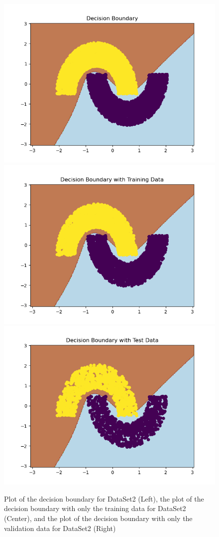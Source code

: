 \documentclass[letterpaper, 12pt]{article}
\begin{document}
\begin{figure}[H]
\centering
\includegraphics[scale = 0.33]{DataSet2BoundaryPlot}
\includegraphics[scale = 0.33]{DataSet2TrainBoundaryPlot}
\includegraphics[scale = 0.33]{DataSet2TestBoundaryPlot}
\caption{Plot of the decision boundary for DataSet2 (Left), the plot of the decision boundary with only the training data for DataSet2 (Center), and the plot of the decision boundary with only the validation data for DataSet2 (Right)}
\end{figure}
\end{document}
